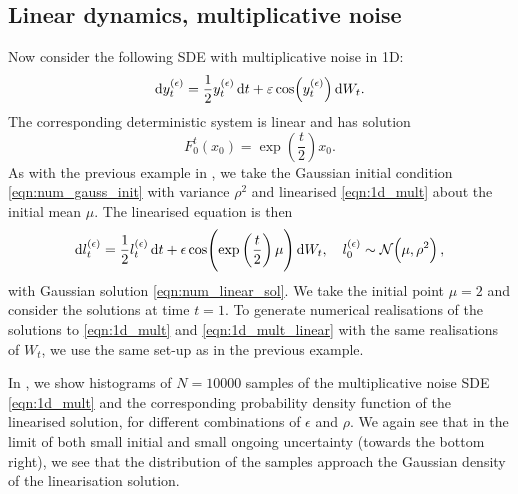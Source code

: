 \subsection{Linear dynamics, multiplicative noise}\label{sec:numerics_multiplicative}
Now consider the following SDE with multiplicative noise in 1D:
\begin{equation}
	\dif y_t^{(\epsilon)} = \frac12 y_t^{(\epsilon)}\dif t + \varepsilon \cos\!\left(y_t^{(\epsilon)}\right) \dif W_t.
		\label{eqn:1d_mult}
\end{equation}
The corresponding deterministic system is linear and has solution
\begin{equation}
F_0^t\!\left(x_0\right) = \exp\!\left(\frac{t}{2}\right) x_0.
	\label{eqn:1d_mult_det_sol}
\end{equation}
As with the previous example in , we take the Gaussian initial condition \eqref{eqn:num_gauss_init} with variance \(\rho^2\) and linearised \eqref{eqn:1d_mult} about the initial mean \(\mu\).
The linearised equation is then
\begin{equation}
	\dif l_t^{(\epsilon)} = \frac12 l_t^{(\epsilon)}\dif t + \epsilon \cos\!\left(\exp\left(\frac{t}{2}\right)\mu\right) \dif W_t, \quad l_0^{(\epsilon)} \sim \Gauss{\mu, \rho^2},
	\label{eqn:1d_mult_linear}
\end{equation}
with Gaussian solution \eqref{eqn:num_linear_sol}.
We take the initial point \(\mu = 2\) and consider the solutions at time \(t = 1\).
To generate numerical realisations of the solutions to \eqref{eqn:1d_mult} and \eqref{eqn:1d_mult_linear} with the same realisations of \(W_t\), we use the same set-up as in the previous example.

In , we show histograms of \(N = 10000\) samples of the multiplicative noise SDE \eqref{eqn:1d_mult} and the corresponding probability density function of the linearised solution, for different combinations of \(\epsilon\) and \(\rho\).
We again see that in the limit of both small initial and small ongoing uncertainty (towards the bottom right), we see that the distribution of the samples approach the Gaussian density of the linearisation solution.

